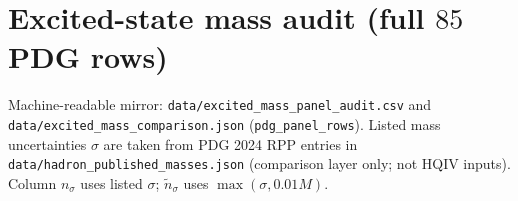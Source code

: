 \documentclass[11pt]{amsart}
\newcommand{\repath}[1]{{\scriptsize\nolinkurl{#1}}}
\begin{document}
\section{Excited-state mass audit (full $85$ PDG rows)}
\label{app:excited-mass-audit}

Machine-readable mirror: \repath{data/excited_mass_panel_audit.csv} and
\repath{data/excited_mass_comparison.json} (\texttt{pdg\_panel\_rows}).
Listed mass uncertainties $\sigma$ are taken from PDG 2024 RPP entries in
\repath{data/hadron_published_masses.json} (comparison layer only; not HQIV inputs).
Column $n_\sigma$ uses listed $\sigma$; $\tilde n_\sigma$ uses $\max(\sigma,0.01M)$.





\end{document}
